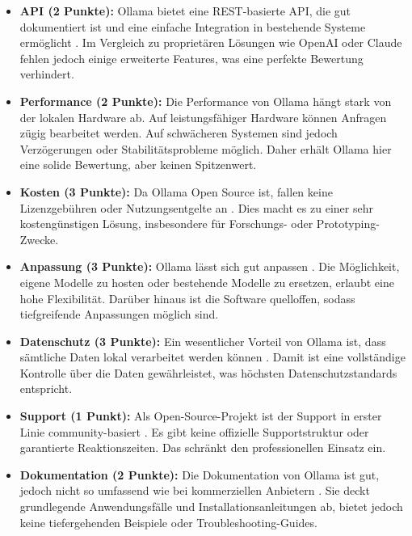       \begin{itemize}
          \item \textbf{\acs{API} (2 Punkte):} Ollama bietet eine \acs{REST}-basierte \acs{API}, die gut dokumentiert ist und eine einfache Integration in bestehende Systeme ermöglicht \autocite{ollama_github}.
          Im Vergleich zu proprietären Lösungen wie OpenAI oder Claude fehlen jedoch einige erweiterte Features, was eine perfekte Bewertung verhindert.

          \item \textbf{Performance (2 Punkte):} Die Performance von Ollama hängt stark von der lokalen Hardware ab.
          Auf leistungsfähiger Hardware können Anfragen zügig bearbeitet werden.
          Auf schwächeren Systemen sind jedoch Verzögerungen oder Stabilitätsprobleme möglich.
          Daher erhält Ollama hier eine solide Bewertung, aber keinen Spitzenwert.

          \item \textbf{Kosten (3 Punkte):} Da Ollama Open Source ist, fallen keine Lizenzgebühren oder Nutzungsentgelte an \autocite{ollama_github}.
          Dies macht es zu einer sehr kostengünstigen Lösung, insbesondere für Forschungs- oder Prototyping-Zwecke.

          \item \textbf{Anpassung (3 Punkte):} Ollama lässt sich gut anpassen \autocite{ollama_github}.
          Die Möglichkeit, eigene Modelle zu hosten oder bestehende Modelle zu ersetzen, erlaubt eine hohe Flexibilität.
          Darüber hinaus ist die Software quelloffen, sodass tiefgreifende Anpassungen möglich sind.

          \item \textbf{Datenschutz (3 Punkte):} Ein wesentlicher Vorteil von Ollama ist, dass sämtliche Daten lokal verarbeitet werden können \autocite{ollama_github}.
          Damit ist eine vollständige Kontrolle über die Daten gewährleistet, was höchsten Datenschutzstandards entspricht.

          \item \textbf{Support (1 Punkt):} Als Open-Source-Projekt ist der Support in erster Linie community-basiert \autocite{ollama_github}.
          Es gibt keine offizielle Supportstruktur oder garantierte Reaktionszeiten. Das schränkt den professionellen Einsatz ein.

          \item \textbf{Dokumentation (2 Punkte):} Die Dokumentation von Ollama ist gut, jedoch nicht so umfassend wie bei kommerziellen Anbietern \autocite{ollama_github}.
          Sie deckt grundlegende Anwendungsfälle und Installationsanleitungen ab, bietet jedoch keine tiefergehenden Beispiele oder Troubleshooting-Guides.
      \end{itemize}

